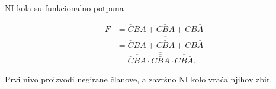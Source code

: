 \begin{frame}[label=02-s025]{NI kola su funkcionalno potpuna}
\par{}
\par\vspace{6mm}
\[\begin{aligned}
F&=\bar CBA+C\bar BA+CB\bar A\\[2mm]
 &=\overline{\overline{\bar CBA+C\bar BA+CB\bar A}}\\[2mm]
 &=\overline{\overline{\bar CBA}\cdot\overline{C\bar BA}\cdot\overline{CB\bar A}}.
\end{aligned}\]
\par\vspace{4mm}
Prvi nivo proizvodi negirane članove, a završno NI kolo vraća njihov zbir.
\end{frame}
